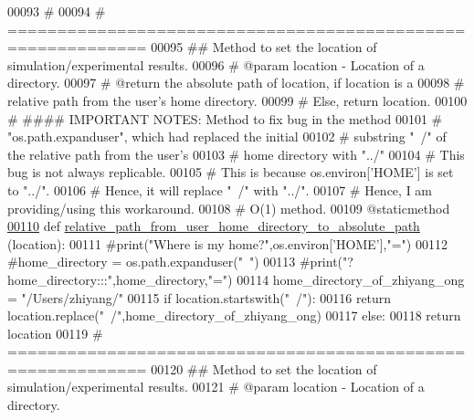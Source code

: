 \begin{DoxyCode}
00093     \textcolor{comment}{#}
00094     \textcolor{comment}{# ============================================================}
00095     \textcolor{comment}{##  Method to set the location of simulation/experimental results.}
00096     \textcolor{comment}{#   @param location - Location of a directory.}
00097     \textcolor{comment}{#   @return the absolute path of location, if location is a}
00098     \textcolor{comment}{#       relative path from the user's home directory.}
00099     \textcolor{comment}{#       Else, return location.}
00100     \textcolor{comment}{#   #### IMPORTANT NOTES: Method to fix bug in the method}
00101     \textcolor{comment}{#       "os.path.expanduser", which had replaced the initial}
00102     \textcolor{comment}{#       substring "~/" of the relative path from the user's}
00103     \textcolor{comment}{#       home directory with "../"}
00104     \textcolor{comment}{#       This bug is not always replicable.}
00105     \textcolor{comment}{#       This is because os.environ['HOME'] is set to "../".}
00106     \textcolor{comment}{#       Hence, it will replace "~/" with "../".}
00107     \textcolor{comment}{#       Hence, I am providing/using this workaround.}
00108     \textcolor{comment}{#   O(1) method.}
00109     @staticmethod
\hypertarget{configuration__manager_8py_source_l00110}{}\hyperlink{classutilities_1_1configuration__manager_1_1config__manager_a15f03ca784cab4d34b95dc020f3b0c23}{00110}     \textcolor{keyword}{def }\hyperlink{classutilities_1_1configuration__manager_1_1config__manager_a15f03ca784cab4d34b95dc020f3b0c23}{relative\_path\_from\_user\_home\_directory\_to\_absolute\_path}
      (location):
00111         \textcolor{comment}{#print("Where is my home?",os.environ['HOME'],"=")}
00112         \textcolor{comment}{#home\_directory = os.path.expanduser("~")}
00113         \textcolor{comment}{#print("?   home\_directory:::",home\_directory,"=")}
00114         home\_directory\_of\_zhiyang\_ong = \textcolor{stringliteral}{"/Users/zhiyang/"}
00115         \textcolor{keywordflow}{if} location.startswith(\textcolor{stringliteral}{"~/"}):
00116             \textcolor{keywordflow}{return} location.replace(\textcolor{stringliteral}{"~/"},home\_directory\_of\_zhiyang\_ong)
00117         \textcolor{keywordflow}{else}:
00118             \textcolor{keywordflow}{return} location
00119     \textcolor{comment}{# ============================================================}
00120     \textcolor{comment}{##  Method to set the location of simulation/experimental results.}
00121     \textcolor{comment}{#   @param location - Location of a directory.}

\end{DoxyCode}
